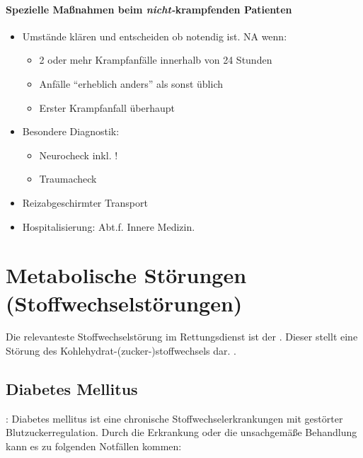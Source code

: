 \begin{gMassnahmenEnv}
\paragraph{Spezielle Ma{\ss}nahmen beim \emph{nicht-}krampfenden Patienten}
\begin{itemize}
    \item Umstände klären und entscheiden ob  notendig ist. NA wenn:
    \begin{itemize}
        \item 2 oder mehr Krampfanfälle innerhalb von 24 Stunden
        \item Anfälle "`erheblich anders"' als sonst üblich
        \item Erster Krampfanfall überhaupt
    \end{itemize}
    \item Besondere Diagnostik:
    \begin{itemize}
        \item Neurocheck inkl. !
        \item Traumacheck
    \end{itemize}
    \item Reizabgeschirmter Transport
    \item Hospitalisierung: Abt.f. Innere Medizin.
\end{itemize}
\end{gMassnahmenEnv}




\section{Metabolische Störungen (Stoffwechselstörungen)}

Die relevanteste Stoffwechselstörung im Rettungsdienst ist der
. Dieser
stellt eine Störung des Kohlehydrat-(zucker-)stoffwechsels dar.
. 

\subsection{Diabetes Mellitus}\label{topic:diabetes}

: Diabetes mellitus ist eine chronische
Stoffwechselerkrankungen mit  gestörter Blutzuckerregulation. 
Durch die Erkrankung oder die unsachgemäße Behandlung kann es zu 
folgenden Notfällen kommen: 

